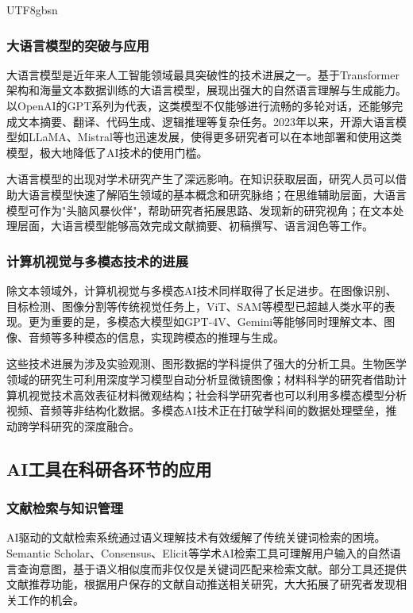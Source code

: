 \documentclass[12pt,a4paper]{article}
\begin{document}
\begin{CJK}{UTF8}{gbsn}
\subsubsection{大语言模型的突破与应用}

大语言模型是近年来人工智能领域最具突破性的技术进展之一。基于Transformer架构和海量文本数据训练的大语言模型，展现出强大的自然语言理解与生成能力。以OpenAI的GPT系列为代表，这类模型不仅能够进行流畅的多轮对话，还能够完成文本摘要、翻译、代码生成、逻辑推理等复杂任务。2023年以来，开源大语言模型如LLaMA、Mistral等也迅速发展，使得更多研究者可以在本地部署和使用这类模型，极大地降低了AI技术的使用门槛。

大语言模型的出现对学术研究产生了深远影响。在知识获取层面，研究人员可以借助大语言模型快速了解陌生领域的基本概念和研究脉络；在思维辅助层面，大语言模型可作为"头脑风暴伙伴"，帮助研究者拓展思路、发现新的研究视角；在文本处理层面，大语言模型能够高效完成文献摘要、初稿撰写、语言润色等工作。

\subsubsection{计算机视觉与多模态技术的进展}

除文本领域外，计算机视觉与多模态AI技术同样取得了长足进步。在图像识别、目标检测、图像分割等传统视觉任务上，ViT、SAM等模型已超越人类水平的表现。更为重要的是，多模态大模型如GPT-4V、Gemini等能够同时理解文本、图像、音频等多种模态的信息，实现跨模态的推理与生成。

这些技术进展为涉及实验观测、图形数据的学科提供了强大的分析工具。生物医学领域的研究生可利用深度学习模型自动分析显微镜图像；材料科学的研究者借助计算机视觉技术高效表征材料微观结构；社会科学研究者也可以利用多模态模型分析视频、音频等非结构化数据。多模态AI技术正在打破学科间的数据处理壁垒，推动跨学科研究的深度融合。

\subsection{AI工具在科研各环节的应用}

\subsubsection{文献检索与知识管理}

AI驱动的文献检索系统通过语义理解技术有效缓解了传统关键词检索的困境。Semantic Scholar、Consensus、Elicit等学术AI检索工具可理解用户输入的自然语言查询意图，基于语义相似度而非仅仅是关键词匹配来检索文献。部分工具还提供文献推荐功能，根据用户保存的文献自动推送相关研究，大大拓展了研究者发现相关工作的机会。


\end{CJK}
\end{document}
